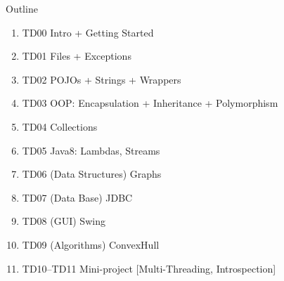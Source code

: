 \documentclass[English,t,%
hyperref={%
    pdftitle={FISA-DE2 OOP in Java},%
    pdfauthor={Guillaume Muller},%
    pdfsubject={OOP in Java},%
    pdfkeywords={OOP, Java}%
    },%
xcolor={pdftex,svgnames} %
]{beamer}
\begin{document}
\begin{frame}{Outline}

  \begin{enumerate}
    \item TD00 Intro + Getting Started
    \item TD01 Files + Exceptions
    \item TD02 POJOs + Strings + Wrappers
    \item TD03 OOP: Encapsulation + Inheritance + Polymorphism %
    \item TD04 Collections
    \item TD05 Java8: Lambdas, Streams
    \item TD06 (Data Structures) Graphs
    \item TD07 (Data Base) JDBC
    \item TD08 (GUI) Swing
    \item TD09 (Algorithms) ConvexHull
    \item TD10--TD11 Mini-project [Multi-Threading, Introspection]
  \end{enumerate}

\end{frame}
\end{document}
